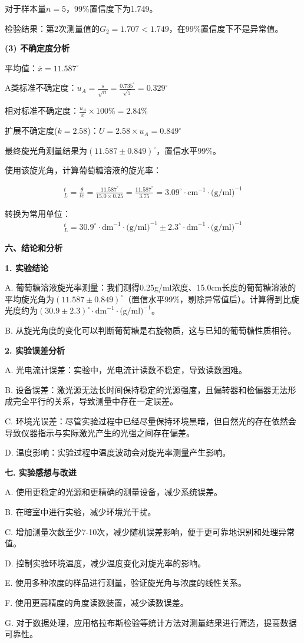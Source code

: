 ﻿\documentclass[12pt,a4paper]{article}
\begin{document}
对于样本量$n=5$，99\%置信度下为1.749。

检验结果：第2次测量值的$G_2 = 1.707 < 1.749$，在99\%置信度下不是异常值。

\textbf{(3) 不确定度分析}

平均值：$\overline{x} = 11.587^\circ$

A类标准不确定度：$u_A = \frac{s}{\sqrt{n}} = \frac{0.735^\circ}{\sqrt{5}} = 0.329^\circ$

相对标准不确定度：$\frac{u_A}{\overline{x}} \times 100\% = 2.84\%$

扩展不确定度($k=2.58$)：$U = 2.58 \times u_A = 0.849^\circ$

最终旋光角测量结果为$(11.587 \pm 0.849)^\circ$，置信水平99\%。

使用该旋光角，计算葡萄糖溶液的旋光率：

\begin{eqnarray}
    [\alpha]_L^t = \frac{\theta}{lc} = \frac{11.587^\circ}{15.0 \times 0.25} = \frac{11.587^\circ}{3.75} = 3.09^\circ \cdot \text{cm}^{-1} \cdot \text{(g/ml)}^{-1}
\end{eqnarray}

转换为常用单位：
\begin{eqnarray}
    [\alpha]_L^t = 30.9^\circ \cdot \text{dm}^{-1} \cdot \text{(g/ml)}^{-1} \pm 2.3^\circ \cdot \text{dm}^{-1} \cdot \text{(g/ml)}^{-1}
\end{eqnarray}

\vspace{0.5cm}

\textbf{六、结论和分析}

\textbf{1. 实验结论}

A. 葡萄糖溶液旋光率测量：我们测得0.25g/ml浓度、15.0cm长度的葡萄糖溶液的平均旋光角为$(11.587 \pm 0.849)^\circ$（置信水平99\%，剔除异常值后）。计算得到比旋光度约为$(30.9 \pm 2.3)^\circ \cdot \text{dm}^{-1} \cdot \text{(g/ml)}^{-1}$。

B. 从旋光角度的变化可以判断葡萄糖是右旋物质，这与已知的葡萄糖性质相符。

\textbf{2. 实验误差分析}

A. 光电流计误差：实验中，光电流计读数不稳定，导致读数困难。

B. 设备误差：激光源无法长时间保持稳定的光源强度，且偏转器和检偏器无法形成完全平行的关系，导致测量中存在一定误差。

C. 环境光误差：尽管实验过程中已经尽量保持环境黑暗，但自然光的存在依然会导致仪器指示与实际激光产生的光强之间存在偏差。

D. 温度影响：实验过程中温度波动会对旋光率测量产生影响。

\textbf{七. 实验感想与改进}

A. 使用更稳定的光源和更精确的测量设备，减少系统误差。

B. 在暗室中进行实验，减少环境光干扰。

C. 增加测量次数至少7-10次，减少随机误差影响，便于更可靠地识别和处理异常值。

D. 控制实验环境温度，减少温度变化对旋光率的影响。

E. 使用多种浓度的样品进行测量，验证旋光角与浓度的线性关系。

F. 使用更高精度的角度读数装置，减少读数误差。

G. 对于数据处理，应用格拉布斯检验等统计方法对测量结果进行筛选，提高数据可靠性。
\end{document}
